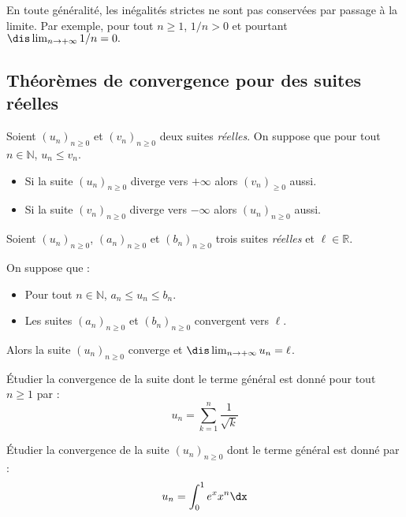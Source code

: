 \documentclass[a4paper,10pt]{report}
\begin{document}
\begin{rem} En toute généralité, les inégalités strictes ne sont pas conservées par passage à la limite. Par exemple, pour tout $n \geq 1$, $1/n > 0$ et pourtant $\dis \lim_{n \rightarrow + \infty}1/n= 0.$
\end{rem}


\subsection{Théorèmes de convergence pour des suites réelles}

\begin{thm}
Soient $(u_n)_{n \geq 0}$ et $(v_n)_{n \geq 0}$ deux suites \textit{réelles}. On suppose que pour tout $n \in \mathbb{N}$, $u_n \leq v_n$.
\begin{itemize}
 \item Si la suite $(u_n)_{n \geq 0}$ diverge vers $+\infty$ alors  $(v_n)_{\geq 0}$ aussi. 
 \item Si la suite $(v_n)_{n \geq 0}$ diverge vers $-\infty$ alors $(u_n)_{n \geq 0}$ aussi.
 \end{itemize}
\end{thm}

\begin{thm}
Soient $(u_n)_{n \geq 0}$, $(a_n)_{n \geq 0}$ et $(b_n)_{n \geq 0}$ trois suites \textit{réelles} et $\ell \in \mathbb{R}$.

\medskip

\noindent On suppose que :

\begin{itemize}
\item Pour tout $n \in \mathbb{N}$,  $a_n \leq u_n \leq b_n$.
\item Les suites $(a_n)_{n \geq 0}$ et $(b_n)_{n \geq 0}$ convergent vers $\ell$.
\end{itemize}

Alors la suite $(u_n)_{n \geq 0}$ converge et $\dis \lim_{n \rightarrow + \infty} u_n = \ell$.
\end{thm}

\begin{ex} Étudier la convergence de la suite dont le terme général est donné pour tout $n \geq 1$ par :
$$ u_n = \sum_{k=1}^n \frac{1}{\sqrt{k}}$$

\vspace{5cm}
\end{ex}

\begin{exa} Étudier la convergence de la suite $(u_n)_{n \geq 0}$ dont le terme général est donné par :
$$ u_n = \int_0^1 e^x x^n \dx$$
\end{exa}
\end{document}
